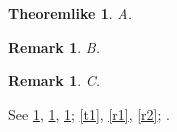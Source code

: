 \documentclass{article}
\newtheorem{theoremlike}{Theoremlike}
\newtheorem{remark}[remcnt]{Remark}
\begin{document}
\begin{theoremlike}\label{t1} A. \end{theoremlike}
\begin{remark}\label{r1} B. \end{remark}
\begin{remark}\label{r2} C. \end{remark}
See \ref{t1}, \ref{r1}, \ref{r2}; \autoref{t1}, \autoref{r1}, \autoref{r2}; .
\end{document}
